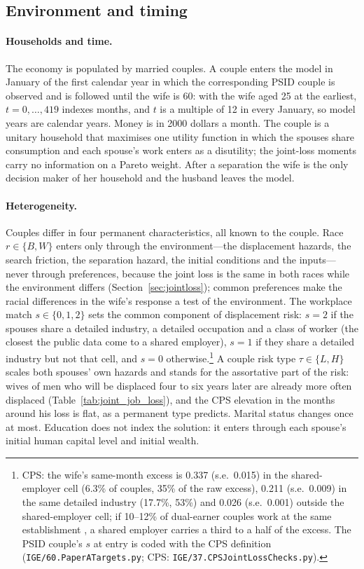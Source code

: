 \subsection{Environment and timing}

\paragraph{Households and time.} The economy is populated by married couples. A couple enters the model in January of
the first calendar year in which the corresponding PSID couple is observed and is followed until the wife is 60: with
the wife aged 25 at the earliest, $t = 0, \dots, 419$ indexes months, and $t$ is a multiple of 12 in every January, so
model years are calendar years. Money is in 2000 dollars a month. The couple is a unitary household that maximises one
utility function in which the spouses share consumption and each spouse's work enters as a disutility; the joint-loss
moments carry no information on a Pareto weight. After a separation the wife is the only decision maker of her
household and the husband leaves the model.

\paragraph{Heterogeneity.} Couples differ in four permanent characteristics, all known to the couple. Race
$r \in \{B, W\}$ enters only through the environment---the displacement hazards, the search friction, the separation
hazard, the initial conditions and the inputs---never through preferences, because the joint loss is the same in both
races while the environment differs (Section~\ref{sec:jointloss}); common preferences make the racial differences in
the wife's response a test of the environment. The workplace match $s \in \{0, 1, 2\}$ sets the common component of
displacement risk: $s = 2$ if the spouses share a detailed industry, a detailed occupation and a class of worker (the
closest the public data come to a shared employer), $s = 1$ if they share a detailed industry but not that cell, and
$s = 0$ otherwise.\footnote{CPS: the wife's same-month excess is 0.337 (s.e.\ 0.015) in the shared-employer cell
(6.3\% of couples, 35\% of the raw excess), 0.211 (s.e.\ 0.009) in the same detailed industry (17.7\%, 53\%) and 0.026
(s.e.\ 0.001) outside the shared-employer cell; if 10--12\% of dual-earner couples work at the same establishment
\citep{hyatt2019coworking}, a shared employer carries a third to a half of the excess. The PSID couple's $s$ at entry
is coded with the CPS definition (\texttt{IGE/60.PaperATargets.py}; CPS: \texttt{IGE/37.CPSJointLossChecks.py}).} A
couple risk type $\tau \in \{L, H\}$ scales both spouses' own hazards and stands for the assortative part of the risk:
wives of men who will be displaced four to six years later are already more often displaced
(Table~\ref{tab:joint_job_loss}), and the CPS elevation in the months around his loss is flat, as a permanent type
predicts. Marital status changes once at most. Education does not index the solution: it enters through each spouse's
initial human capital level and initial wealth.

